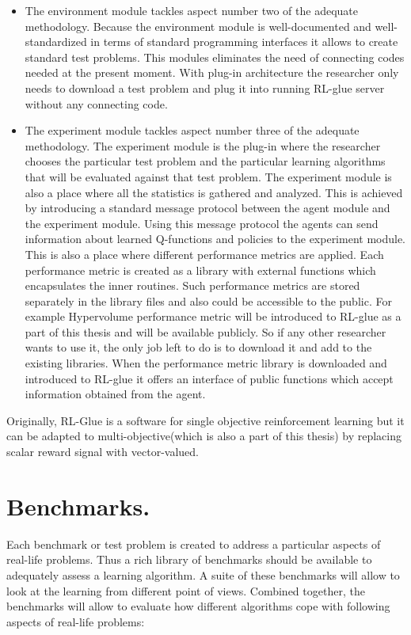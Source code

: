 {{\begin{itemize}
\item The environment module tackles aspect number two of the adequate methodology. Because the environment module is well-documented and well-standardized in terms of standard programming interfaces it allows to create standard test problems. This modules eliminates the need of connecting codes needed at the present moment. With plug-in architecture the researcher only needs to download a test problem and plug it into running RL-glue server without any connecting code.

\item The experiment module tackles aspect number three of the adequate methodology. The experiment module is the plug-in where the researcher chooses the particular test problem and the particular learning algorithms that will be evaluated against that test problem. The experiment module is also a place where all the statistics is gathered and analyzed. This is achieved by introducing a standard message protocol between the agent module and the experiment module. Using this message protocol the agents can send information about learned Q-functions and policies to the experiment module. This is also a place where different performance metrics are applied. Each performance metric is created as a library with external functions which encapsulates the inner routines. Such performance metrics are stored separately in the library files and also could be accessible to the public. For example Hypervolume performance metric will be introduced to RL-glue as a part of this thesis and will be available publicly. So if any other researcher wants to use it, the only job left to do is to download it and add to the existing libraries. When the performance metric library is downloaded and introduced to RL-glue it offers an interface of public functions which accept information obtained from the agent.

\end{itemize}

Originally, RL-Glue is a software for single objective reinforcement learning but it can be adapted to multi-objective(which is also a part of this thesis) by replacing scalar reward signal with vector-valued. \\

\section{Benchmarks.}

Each benchmark or test problem is created to address a particular aspects of real-life problems. Thus a rich library of benchmarks should be available to adequately assess a learning algorithm. A suite of these benchmarks will allow to look at the learning from different point of views. Combined together, the benchmarks will allow to evaluate how different algorithms cope with following aspects of real-life problems:

}}
